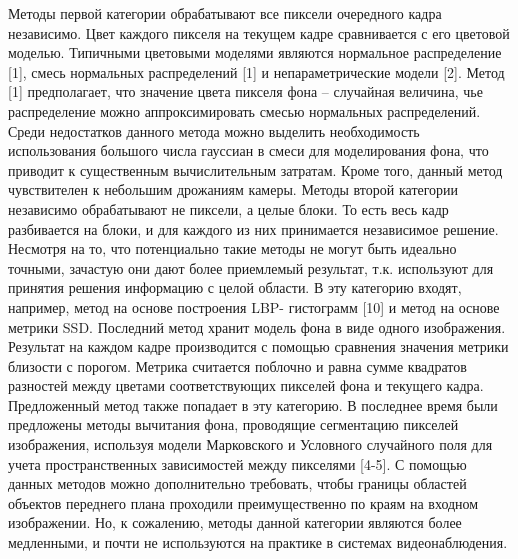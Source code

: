 \documentclass[12pt]{article}
\begin{document}
Методы первой категории обрабатывают все пиксели очередного кадра независимо. Цвет каждого пикселя на текущем кадре сравнивается с его цветовой моделью. Типичными цветовыми моделями являются нормальное распределение [1], смесь нормальных распределений [1] и непараметрические модели [2]. Метод [1] предполагает, что значение цвета пикселя фона – случайная величина, чье распределение можно аппроксимировать смесью нормальных распределений. Среди недостатков данного метода можно выделить необходимость использования большого числа гауссиан в смеси для моделирования фона, что приводит к существенным вычислительным затратам. Кроме того,  данный метод чувствителен к небольшим дрожаниям камеры. Методы второй категории независимо обрабатывают не пиксели, а целые блоки. То есть весь кадр разбивается на блоки, и для каждого из них принимается независимое решение. Несмотря на то, что потенциально такие методы не могут быть идеально точными, зачастую они дают более приемлемый результат, т.к. используют для принятия решения информацию с целой области. В эту категорию входят, например, метод на основе построения LBP- гистограмм [10] и метод на основе метрики SSD. Последний метод хранит модель фона в виде одного изображения. Результат на каждом кадре производится с помощью сравнения значения метрики близости с порогом. Метрика считается поблочно и равна сумме квадратов разностей между цветами соответствующих пикселей фона и текущего кадра. Предложенный метод также попадает в эту категорию. В последнее время были предложены методы вычитания фона, проводящие сегментацию пикселей изображения, используя модели Марковского и Условного случайного поля для учета пространственных зависимостей между пикселями [4-5]. С помощью данных методов можно дополнительно требовать, чтобы границы областей объектов переднего плана проходили преимущественно по краям на входном изображении. Но, к сожалению, методы данной категории являются более медленными, и почти не используются на практике в системах видеонаблюдения. 
\end{document}
